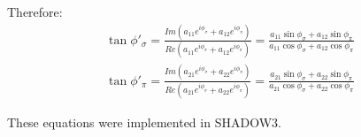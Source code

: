 \documentclass{iucr}
\begin{document}
Therefore:
\begin{eqnarray}
\label{final2}
\tan{\phi'_\sigma} = \frac{Im(a_{11} e^{i \phi_\sigma} + a_{12} e^{i \phi_\pi})}
                          {Re(a_{11} e^{i \phi_\sigma} + a_{12} e^{i \phi_\pi})} = 
                          \frac{a_{11} \sin{\phi_\sigma} + a_{12} \sin{\phi_\pi}}
                               {a_{11} \cos{\phi_\sigma} + a_{12} \cos{\phi_\pi}}  \nonumber \\ 
\tan{\phi'_\pi} =  \frac{Im(a_{21} e^{i \phi_\sigma} + a_{22} e^{i \phi_\pi})}
                        {Re(a_{21} e^{i \phi_\sigma} + a_{22} e^{i \phi_\pi})} = 
                        \frac{a_{21} \sin{\phi_\sigma} + a_{22} \sin{\phi_\pi}}
                             {a_{21} \cos{\phi_\sigma} + a_{22} \cos{\phi_\pi}}
\end{eqnarray}


These equations were implemented in SHADOW3.




\end{document}
